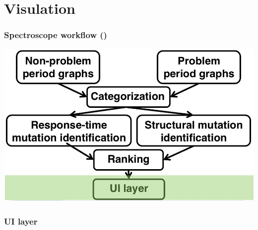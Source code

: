 \documentclass[11pt]{beamer}
\begin{document}
\section{Visulation}
\begin{frame}
\frametitle{Spectroscope workflow ()}
\includegraphics[width=\textwidth]{fig/work4.jpg}
\end{frame}

\begin{frame}
\frametitle{UI layer}
\end{frame}
\end{document}
